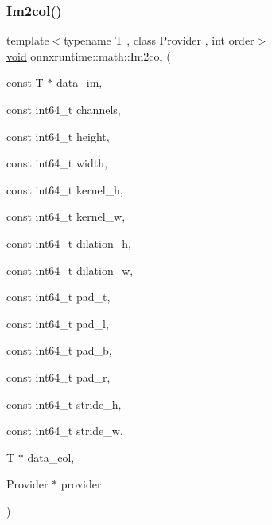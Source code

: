 \subsubsection{\texorpdfstring{Im2col()}{Im2col()}}
{\footnotesize\ttfamily template$<$typename T , class Provider , int order$>$ \\
\mbox{\hyperlink{mlasi_8h_a88f941d423cb2a819b70a1358982b1a6}{void}} onnxruntime\+::math\+::\+Im2col (\begin{DoxyParamCaption}\item[{const T $\ast$}]{data\+\_\+im,  }\item[{const int64\+\_\+t}]{channels,  }\item[{const int64\+\_\+t}]{height,  }\item[{const int64\+\_\+t}]{width,  }\item[{const int64\+\_\+t}]{kernel\+\_\+h,  }\item[{const int64\+\_\+t}]{kernel\+\_\+w,  }\item[{const int64\+\_\+t}]{dilation\+\_\+h,  }\item[{const int64\+\_\+t}]{dilation\+\_\+w,  }\item[{const int64\+\_\+t}]{pad\+\_\+t,  }\item[{const int64\+\_\+t}]{pad\+\_\+l,  }\item[{const int64\+\_\+t}]{pad\+\_\+b,  }\item[{const int64\+\_\+t}]{pad\+\_\+r,  }\item[{const int64\+\_\+t}]{stride\+\_\+h,  }\item[{const int64\+\_\+t}]{stride\+\_\+w,  }\item[{T $\ast$}]{data\+\_\+col,  }\item[{Provider $\ast$}]{provider }\end{DoxyParamCaption})}

\mbox{\label{namespaceonnxruntime_1_1math_afb1aa82e9ab3e9b38a7062dc6a0ea6d5}} 
